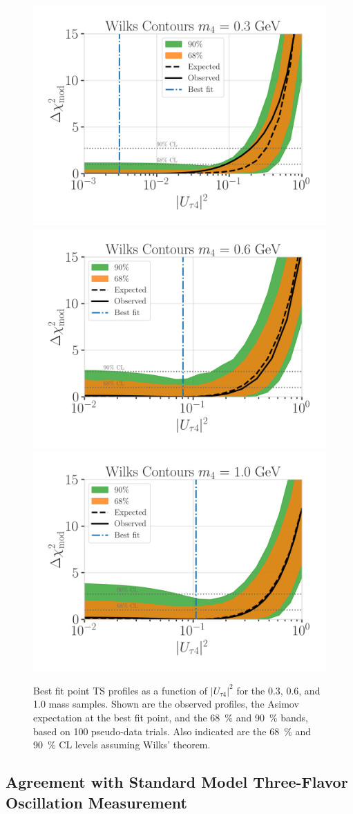 \begin{figure}[h]
    \includegraphics[width=0.49\linewidth]{figures/results/best_fit/brazil_band_with_asimov_0.3_GeV_updated_with_bfp_with_1sigma.png}
    \includegraphics[width=0.49\linewidth]{figures/results/best_fit/brazil_band_with_asimov_0.6_GeV_updated_with_bfp_with_1sigma.png}
    \includegraphics[width=0.49\linewidth]{figures/results/best_fit/brazil_band_with_asimov_1.0_GeV_updated_with_bfp_with_1sigma.png}
	\caption[Best fit point TS profiles]{Best fit point TS profiles as a function of $|U_{\tau4}|^2$ for the \SI{0.3}{\gev}, \SI{0.6}{\gev}, and \SI{1.0}{\gev} mass samples. Shown are the observed profiles, the Asimov expectation at the best fit point, and the \SI{68}{\percent} and \SI{90}{\percent} bands, based on 100 pseudo-data trials. Also indicated are the \SI{68}{\percent} and \SI{90}{\percent} CL levels assuming Wilks' theorem.}
\end{figure}


\subsection{Agreement with Standard Model Three-Flavor Oscillation Measurement}

